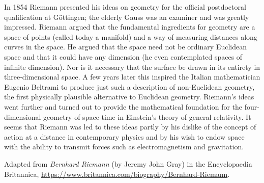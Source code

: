 In 1854 Riemann presented his ideas on geometry for the official postdoctoral qualification at Göttingen; the elderly Gauss was an examiner and was greatly impressed. Riemann argued that the fundamental ingredients for geometry are a space of points (called today a manifold) and a way of measuring distances along curves in the space. He argued that the space need not be ordinary Euclidean space and that it could have any dimension (he even contemplated spaces of infinite dimension). Nor is it necessary that the surface be drawn in its entirety in three-dimensional space. A few years later this inspired the Italian mathematician Eugenio Beltrami to produce just such a description of non-Euclidean geometry, the first physically plausible alternative to Euclidean geometry. Riemann's ideas went further and turned out to provide the mathematical foundation for the four-dimensional geometry of space-time in Einstein's theory of general relativity. It seems that Riemann was led to these ideas partly by his dislike of the concept of action at a distance in contemporary physics and by his wish to endow space with the ability to transmit forces such as electromagnetism and gravitation.

\begin{flushright}
  Adapted from \textit{Bernhard Riemann} (by Jeremy John Gray) in the Encyclopaedia Britannica, \url{https://www.britannica.com/biography/Bernhard-Riemann}.
\end{flushright}

